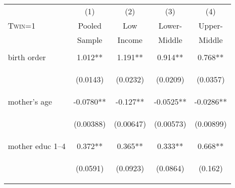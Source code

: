 \documentclass[]{article}
\begin{document}
\begin{center}
\begin{tabular}{lcccc} \hline
 & (1) & (2) & (3) & (4) \\
\textsc{Twin=1} & Pooled & Low & Lower- & Upper- \\ 
 & Sample & Income & Middle & Middle \\  \midrule
\vspace{4pt} & \begin{footnotesize}\end{footnotesize} & \begin{footnotesize}\end{footnotesize} & \begin{footnotesize}\end{footnotesize} & \begin{footnotesize}\end{footnotesize} \\
birth order & 1.012** & 1.191** & 0.914** & 0.768** \\
\vspace{4pt} & \begin{footnotesize}(0.0143)\end{footnotesize} & \begin{footnotesize}(0.0232)\end{footnotesize} & \begin{footnotesize}(0.0209)\end{footnotesize} & \begin{footnotesize}(0.0357)\end{footnotesize} \\
mother's age & -0.0780** & -0.127** & -0.0525** & -0.0286** \\
\vspace{4pt} & \begin{footnotesize}(0.00388)\end{footnotesize} & \begin{footnotesize}(0.00647)\end{footnotesize} & \begin{footnotesize}(0.00573)\end{footnotesize} & \begin{footnotesize}(0.00899)\end{footnotesize} \\
mother educ 1--4 & 0.372** & 0.365** & 0.333** & 0.668** \\
\vspace{4pt} & \begin{footnotesize}(0.0591)\end{footnotesize} & \begin{footnotesize}(0.0923)\end{footnotesize} & \begin{footnotesize}(0.0864)\end{footnotesize} & \begin{footnotesize}(0.162)\end{footnotesize} \\

\end{tabular}
\end{center}
\end{document}

